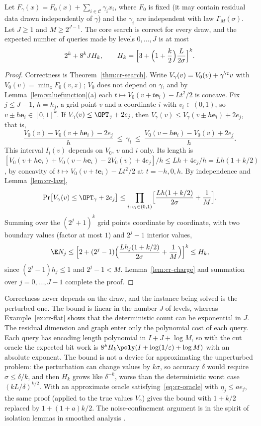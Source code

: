 \begin{theorem}\label{thm:cr-smoothed}
Let $F_\gamma(x)=F_0(x)+\sum_{i\in\mathcal C}\gamma_ix_i$, where $F_0$ is
fixed (it may contain residual data drawn independently of $\gamma$)
and the $\gamma_i$ are independent with law $\Gamma_M(\sigma)$. Let $J\ge1$
and $M\ge2^{J-1}$. The core search is correct for every draw, and the
expected number of queries made by levels $0,\ldots,J$ is at most
\[
2^k+8^kJH_k,\qquad
H_k=\Bigl[3+\Bigl(1+\frac k2\Bigr)\frac L{2\sigma}\Bigr]^k .
\]
\end{theorem}
\begin{proof}
Correctness is Theorem~\ref{thm:cr-search}. Write
$V_\gamma(v)=V_0(v)+\gamma^{\T}v$ with
$V_0(v)=\min_zF_0(v,z)$; $V_0$ does not depend on $\gamma$, and by
Lemma~\ref{lem:valuefunction}(a) each $t\mapsto V_0(v+t\mathbf e_i)-Lt^2/2$ is
concave. Fix $j\le J-1$, $h=h_j$, a grid point $v$ and a coordinate $i$
with $v_i\in(0,1)$, so $v\pm h\mathbf e_i\in[0,1]^k$. If
$V_\gamma(v)\le\OPT_\gamma+2e_j$, then
$V_\gamma(v)\le V_\gamma(v\pm h\mathbf e_i)+2e_j$, that is,
\[
\frac{V_0(v)-V_0(v+h\mathbf e_i)-2e_j}{h}\ \le\ \gamma_i\ \le\
\frac{V_0(v-h\mathbf e_i)-V_0(v)+2e_j}{h}.
\]
This interval $I_i(v)$ depends on $V_0$, $v$ and $i$ only. Its length is
$[V_0(v+h\mathbf e_i)+V_0(v-h\mathbf e_i)-2V_0(v)+4e_j]/h\le Lh+4e_j/h
=Lh(1+k/2)$, by concavity of $t\mapsto V_0(v+t\mathbf e_i)-Lt^2/2$ at
$t=-h,0,h$. By independence and Lemma~\ref{lem:cr-law},
\[
\Pr\bigl[V_\gamma(v)\le\OPT_\gamma+2e_j\bigr]\le
\prod_{i:\,v_i\in(0,1)}\Bigl[\frac{Lh(1+k/2)}{2\sigma}+\frac1M\Bigr].
\]
Summing over the $(2^j+1)^k$ grid points coordinate by coordinate, with
two boundary values (factor at most $1$) and $2^j-1$ interior values,
\[
\E N_j\le\Bigl[2+(2^j-1)\Bigl(\frac{Lh_j(1+k/2)}{2\sigma}+\frac1M\Bigr)\Bigr]^k
\le H_k ,
\]
since $(2^j-1)h_j\le1$ and $2^j-1<M$. Lemma~\ref{lem:cr-charge} and
summation over $j=0,\ldots,J-1$ complete the proof.
\end{proof}

\begin{remark}\label{rem:cr-smoothed}
Correctness never depends on the draw, and the instance being solved is
the perturbed one. The bound is linear in the number $J$ of levels,
whereas Example~\ref{ex:cr-flat} shows that the deterministic count can be
exponential in $J$. The residual dimension and graph enter only the
polynomial cost of each query. Each query has encoding length polynomial
in $I+J+\log M$, so with the cut oracle the expected bit work is
$8^kH_k\poly(I+\log(1/\varepsilon)+\log M)$ with an absolute exponent.
The bound is not a device for approximating the unperturbed problem: the
perturbation can change values by $k\sigma$, so accuracy $\delta$ would
require $\sigma\le\delta/k$, and then $H_k$ grows like $\delta^{-k}$,
worse than the deterministic worst case $(kL/\delta)^{k/2}$. With an
approximate oracle satisfying~\eqref{eq:cr-oracle} with $\eta_j\le ae_j$,
the same proof (applied to the true values $V_\gamma$) gives the bound
with $1+k/2$ replaced by $1+(1+a)k/2$. The noise-confinement argument is
in the spirit of isolation lemmas in smoothed analysis
\cite{BeierVocking2004,RoglinVocking2007}.
\end{remark}

